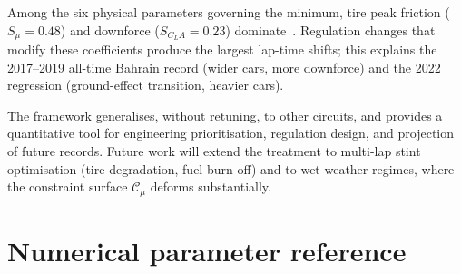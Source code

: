 \documentclass[11pt,twocolumn]{article}
\theoremstyle{definition}
\theoremstyle{remark}
\begin{document}
Among the six physical parameters governing the minimum, tire peak friction
($S_\mu = 0.48$) and downforce ($S_{C_LA} = 0.23$) dominate~\cite{pacejka2012,wright2001,katz1995}. Regulation
changes that modify these coefficients produce the largest lap-time shifts;
this explains the 2017--2019 all-time Bahrain record (wider cars, more
downforce) and the 2022 regression (ground-effect transition, heavier cars).

The framework generalises, without retuning, to other circuits, and provides
a quantitative tool for engineering prioritisation, regulation design, and
projection of future records. Future work will extend the treatment to
multi-lap stint optimisation (tire degradation, fuel burn-off) and to
wet-weather regimes, where the constraint surface $\mathcal{C}_\mu$
deforms substantially.

\appendix

\section{Numerical parameter reference}
\label{app:params}
\end{document}
